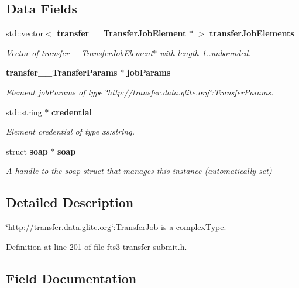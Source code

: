 \subsection*{Data Fields}
\begin{DoxyCompactItemize}
\item 
std::vector$<$ {\bf transfer\_\-\_\-TransferJobElement} $\ast$ $>$ {\bf transferJobElements}
\begin{DoxyCompactList}\small\item\em Vector of transfer\_\-\_\-TransferJobElement$\ast$ with length 1..unbounded. \item\end{DoxyCompactList}\item 
{\bf transfer\_\-\_\-TransferParams} $\ast$ {\bf jobParams}
\begin{DoxyCompactList}\small\item\em Element jobParams of type \char`\"{}http://transfer.data.glite.org\char`\"{}:TransferParams. \item\end{DoxyCompactList}\item 
std::string $\ast$ {\bf credential}
\begin{DoxyCompactList}\small\item\em Element credential of type xs:string. \item\end{DoxyCompactList}\item 
struct {\bf soap} $\ast$ {\bf soap}\label{classtransfer____TransferJob_a8e3bac28f1271ff47a846ca122de51c7}

\begin{DoxyCompactList}\small\item\em A handle to the soap struct that manages this instance (automatically set) \item\end{DoxyCompactList}\end{DoxyCompactItemize}


\subsection{Detailed Description}
\char`\"{}http://transfer.data.glite.org\char`\"{}:TransferJob is a complexType. 

Definition at line 201 of file fts3-\/transfer-\/submit.h.



\subsection{Field Documentation}
